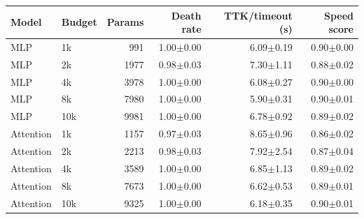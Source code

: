 \begin{tabular}{llrrrr}
\toprule
Model & Budget & Params & Death rate & TTK/timeout (s) & Speed score \\
\midrule
MLP & 1k & 991 & 1.00$\pm$0.00 & 6.09$\pm$0.19 & 0.90$\pm$0.00 \\
MLP & 2k & 1977 & 0.98$\pm$0.03 & 7.30$\pm$1.11 & 0.88$\pm$0.02 \\
MLP & 4k & 3978 & 1.00$\pm$0.00 & 6.08$\pm$0.27 & 0.90$\pm$0.00 \\
MLP & 8k & 7980 & 1.00$\pm$0.00 & 5.90$\pm$0.31 & 0.90$\pm$0.01 \\
MLP & 10k & 9981 & 1.00$\pm$0.00 & 6.78$\pm$0.92 & 0.89$\pm$0.02 \\
Attention & 1k & 1157 & 0.97$\pm$0.03 & 8.65$\pm$0.96 & 0.86$\pm$0.02 \\
Attention & 2k & 2213 & 0.98$\pm$0.03 & 7.92$\pm$2.54 & 0.87$\pm$0.04 \\
Attention & 4k & 3589 & 1.00$\pm$0.00 & 6.85$\pm$1.13 & 0.89$\pm$0.02 \\
Attention & 8k & 7673 & 1.00$\pm$0.00 & 6.62$\pm$0.53 & 0.89$\pm$0.01 \\
Attention & 10k & 9325 & 1.00$\pm$0.00 & 6.18$\pm$0.35 & 0.90$\pm$0.01 \\
\bottomrule
\end{tabular}

